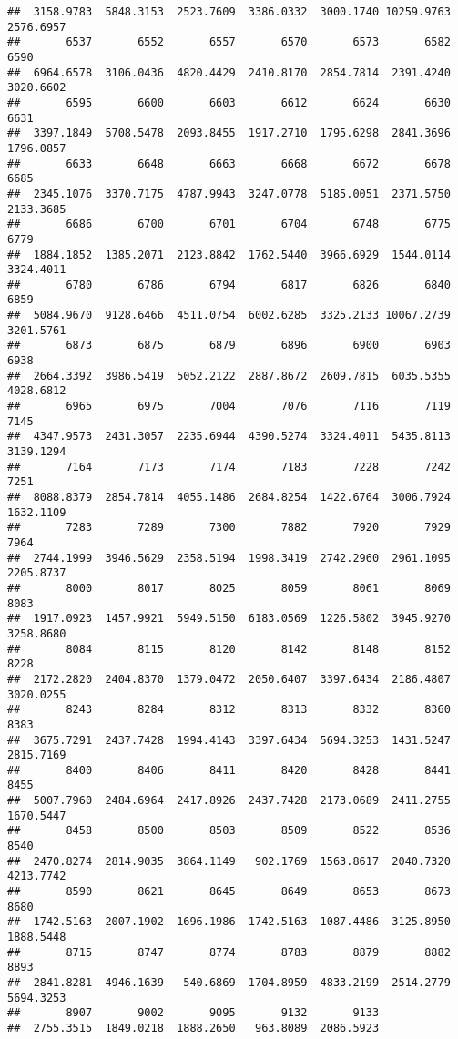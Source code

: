 \documentclass[
]{article}
\begin{document}
\begin{verbatim}
##  3158.9783  5848.3153  2523.7609  3386.0332  3000.1740 10259.9763  2576.6957 
##       6537       6552       6557       6570       6573       6582       6590 
##  6964.6578  3106.0436  4820.4429  2410.8170  2854.7814  2391.4240  3020.6602 
##       6595       6600       6603       6612       6624       6630       6631 
##  3397.1849  5708.5478  2093.8455  1917.2710  1795.6298  2841.3696  1796.0857 
##       6633       6648       6663       6668       6672       6678       6685 
##  2345.1076  3370.7175  4787.9943  3247.0778  5185.0051  2371.5750  2133.3685 
##       6686       6700       6701       6704       6748       6775       6779 
##  1884.1852  1385.2071  2123.8842  1762.5440  3966.6929  1544.0114  3324.4011 
##       6780       6786       6794       6817       6826       6840       6859 
##  5084.9670  9128.6466  4511.0754  6002.6285  3325.2133 10067.2739  3201.5761 
##       6873       6875       6879       6896       6900       6903       6938 
##  2664.3392  3986.5419  5052.2122  2887.8672  2609.7815  6035.5355  4028.6812 
##       6965       6975       7004       7076       7116       7119       7145 
##  4347.9573  2431.3057  2235.6944  4390.5274  3324.4011  5435.8113  3139.1294 
##       7164       7173       7174       7183       7228       7242       7251 
##  8088.8379  2854.7814  4055.1486  2684.8254  1422.6764  3006.7924  1632.1109 
##       7283       7289       7300       7882       7920       7929       7964 
##  2744.1999  3946.5629  2358.5194  1998.3419  2742.2960  2961.1095  2205.8737 
##       8000       8017       8025       8059       8061       8069       8083 
##  1917.0923  1457.9921  5949.5150  6183.0569  1226.5802  3945.9270  3258.8680 
##       8084       8115       8120       8142       8148       8152       8228 
##  2172.2820  2404.8370  1379.0472  2050.6407  3397.6434  2186.4807  3020.0255 
##       8243       8284       8312       8313       8332       8360       8383 
##  3675.7291  2437.7428  1994.4143  3397.6434  5694.3253  1431.5247  2815.7169 
##       8400       8406       8411       8420       8428       8441       8455 
##  5007.7960  2484.6964  2417.8926  2437.7428  2173.0689  2411.2755  1670.5447 
##       8458       8500       8503       8509       8522       8536       8540 
##  2470.8274  2814.9035  3864.1149   902.1769  1563.8617  2040.7320  4213.7742 
##       8590       8621       8645       8649       8653       8673       8680 
##  1742.5163  2007.1902  1696.1986  1742.5163  1087.4486  3125.8950  1888.5448 
##       8715       8747       8774       8783       8879       8882       8893 
##  2841.8281  4946.1639   540.6869  1704.8959  4833.2199  2514.2779  5694.3253 
##       8907       9002       9095       9132       9133 
##  2755.3515  1849.0218  1888.2650   963.8089  2086.5923
\end{verbatim}
\end{document}
